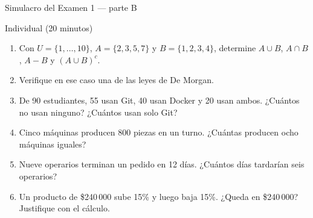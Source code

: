 \documentclass[aspectratio=169,10pt]{beamer}
\begin{document}
\begin{frame}{Simulacro del Examen 1 — parte B}
  \begin{alertblock}{Individual (20 minutos)}
    \scriptsize
    \begin{enumerate}\setlength{\itemsep}{0.02cm}
      \item Con $U=\{1,\dots,10\}$, $A=\{2,3,5,7\}$ y $B=\{1,2,3,4\}$,
            determine $A\cup B$, $A\cap B$, $A-B$ y $(A\cup B)^{c}$.
      \item Verifique en ese caso una de las leyes de De Morgan.
      \item De 90 estudiantes, 55 usan Git, 40 usan Docker y 20 usan ambos.
            ¿Cuántos no usan ninguno? ¿Cuántos usan solo Git?
      \item Cinco máquinas producen 800 piezas en un turno. ¿Cuántas producen
            ocho máquinas iguales?
      \item Nueve operarios terminan un pedido en 12 días. ¿Cuántos días
            tardarían seis operarios?
      \item Un producto de \$240\,000 sube 15\% y luego baja 15\%.
            ¿Queda en \$240\,000? Justifique con el cálculo.
    \end{enumerate}
  \end{alertblock}
\end{frame}
\end{document}
